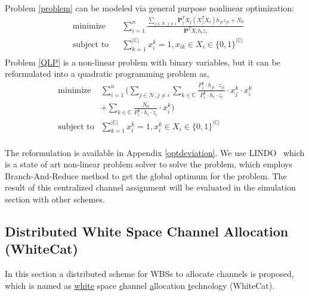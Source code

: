 \documentclass[times]{ettauth}
\theoremstyle{mytheoremstyle}
\theoremstyle{mytheoremstyle}
\theoremstyle{mytheoremstyle}
\renewcommand{\vec}[1]{\mathbf{#1}}
\begin{document}
Problem \ref{problem} can be modeled via general purpose nonlinear optimization:
	\begin{equation}
\label{QLP}
		\begin{aligned}
		& \underset{}{\text{minimize}}
		& & \sum\limits^{n}_{i=1} \frac{\sum\limits_{j\in\mathcal{N}, j\neq i}\vec{P}_j^TX_j(X_j^TX_i)h_{ji}z_{ji} + N_0}{\vec{P}^TX_ih_iz_i}\\
		& \text{subject to}
		& & \sum\limits_{k=1}^{|\mathbb{C}|}x_i^k=1, x_{ik}\in X_i\in \{0,1\}^{|\mathbb{C}|}\\
		\end{aligned}
	\end{equation}
Problem \ref{QLP} is a non-linear problem with binary variables, but it can be reformulated into a quadratic programming problem as,
	\begin{equation}
\label{QLP_2}
			\begin{aligned}
			\underset{}{\text{minimize}}
			& \sum\limits^{n}_{i=1} ( \sum\limits_{j\in\mathcal{N}, j\neq i}\sum\limits_{k\in\mathbb{C}} \frac{P_j^k\cdot h_{ji}\cdot z_{ji}}{P_i^k\cdot h_i\cdot z_i}\cdot  x_j^k\cdot x_i^k  \\
			& + \sum\limits_{k\in\mathbb{C}} \frac{N_0}{P_i^k\cdot h_i\cdot z_i}\cdot x_i^k)\\
			\text{subject to} 
			& \sum\limits_{k=1}^{|\mathbb{C}|}x_i^k=1, x_i^k\in X_i\in \{0,1\}^{|\mathbb{C}|}\\
			\end{aligned}
		\end{equation}

The reformulation is available in Appendix \ref{optdeviation}.
We use LINDO~\cite{lindo} which is a state of art non-linear problem solver to solve the problem, which employs Branch-And-Reduce method to get the global optimum for the problem. %
The result of this centralized channel assignment will be evaluated in the simulation section with other schemes. 



\subsection{Distributed White Space Channel Allocation (WhiteCat)}
\label{whitecat}
In this section a distributed scheme for WBSs to allocate channels is proposed, which is named as \underline{white} space \underline{c}hannel \underline{a}llocation \underline{t}echnology (WhiteCat). 
\end{document}
